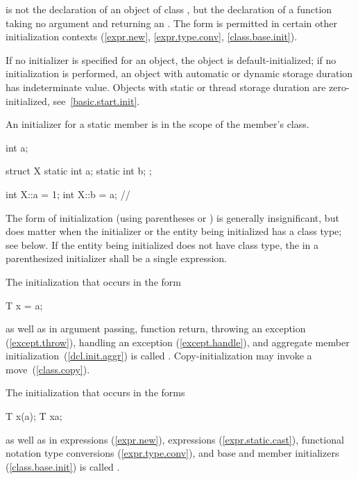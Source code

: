 is not the declaration of an object of class
,
but the declaration of a function taking no argument and returning an
.
The form
\tcode{()}
is permitted in certain other initialization contexts (\ref{expr.new},
\ref{expr.type.conv}, \ref{class.base.init}).
\exitnote

\pnum
If no initializer is specified for an object, the object is default-initialized;
if no initialization is performed, an object
with automatic or dynamic storage duration
has indeterminate value.
\enternote Objects with static or thread storage duration are zero-initialized,
see~\ref{basic.start.init}. \exitnote

\pnum
{}%
An initializer for a static member is in the scope of the member's class.
\enterexample

\begin{codeblock}
int a;

struct X {
  static int a;
  static int b;
};

int X::a = 1;
int X::b = a;       // 
\end{codeblock}
\exitexample

\pnum
The form of initialization (using parentheses or
\tcode{=})
is generally insignificant, but does matter when the initializer or the entity
being initialized has a class type; see below.
If the entity being initialized does not have class type, the
 in a
parenthesized initializer shall be a single expression.

\pnum
{}%
%
The initialization that occurs in the form

\begin{codeblock}
T x = a;
\end{codeblock}

as well as in argument passing, function return,
throwing an exception (\ref{except.throw}),
handling an exception (\ref{except.handle}),
and aggregate member initialization~(\ref{dcl.init.aggr})
is called
.
\enternote Copy-initialization may invoke a move~(\ref{class.copy}). \exitnote

\pnum
The initialization that occurs in the forms

\begin{codeblock}
T x(a);
T x{a};
\end{codeblock}

as well as in
expressions (\ref{expr.new}),
expressions (\ref{expr.static.cast}),
functional notation type conversions (\ref{expr.type.conv}),
and base and member initializers (\ref{class.base.init})
is called
.

